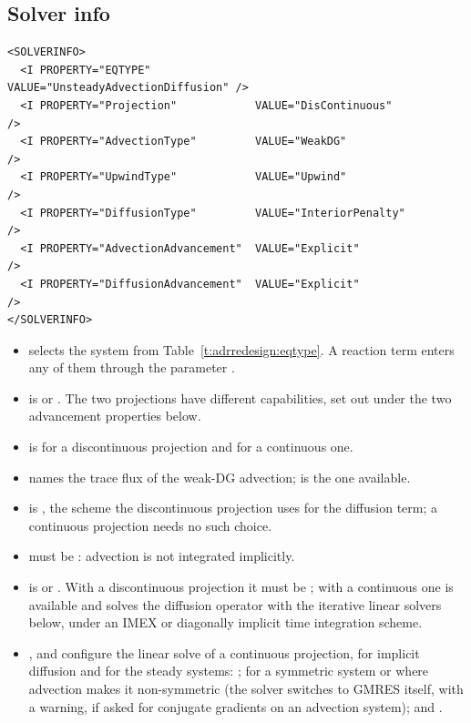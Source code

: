 \subsection*{Solver info}
\begin{lstlisting}[style=XmlStyle]
<SOLVERINFO>
  <I PROPERTY="EQTYPE"                VALUE="UnsteadyAdvectionDiffusion" />
  <I PROPERTY="Projection"            VALUE="DisContinuous"              />
  <I PROPERTY="AdvectionType"         VALUE="WeakDG"                     />
  <I PROPERTY="UpwindType"            VALUE="Upwind"                     />
  <I PROPERTY="DiffusionType"         VALUE="InteriorPenalty"            />
  <I PROPERTY="AdvectionAdvancement"  VALUE="Explicit"                   />
  <I PROPERTY="DiffusionAdvancement"  VALUE="Explicit"                   />
</SOLVERINFO>
\end{lstlisting}
\begin{itemize}
\item {} selects the system from
  Table~\ref{t:adrredesign:eqtype}. A reaction term enters any of them
  through the parameter .
\item {} is  or . The
  two projections have different capabilities, set out under the two
  advancement properties below.
\item {} is  for a discontinuous projection
  and  for a continuous one.
\item {} names the trace flux of the weak-DG advection;
   is the one available.
\item {} is , the scheme the
  discontinuous projection uses for the diffusion term; a continuous
  projection needs no such choice.
\item {} must be : advection is not
  integrated implicitly.
\item {} is  or .
  With a discontinuous projection it must be ; with a
  continuous one  is available and solves the diffusion
  operator with the iterative linear solvers below, under an IMEX or
  diagonally implicit time integration scheme.
\item {},  and
   configure the linear solve of a continuous
  projection, for implicit diffusion and for the steady systems:
  ;  for a symmetric system
  or  where advection makes it non-symmetric (the solver switches
  to GMRES itself, with a warning, if asked for conjugate gradients on an
  advection system); and .
\end{itemize}

